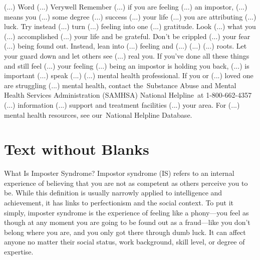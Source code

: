 \documentclass[14pt,a4paper]{extarticle}
\begin{document}
\newline\newline  (...) Word (...) Verywell \newline\newline 
Remember (...) if you are feeling (...) an impostor, (...) means you (...) some degree (...) success (...) your life (...) you are attributing (...) luck. Try instead (...) turn (...) feeling into one (...) gratitude. Look (...) what you (...) accomplished (...) your life and be grateful.
\newline\newline 
Don't be crippled (...) your fear (...) being found out. Instead, lean into (...) feeling and (...) (...) (...) roots. Let your guard down and let others see (...) real you. If you've done all these things and still feel (...) your feeling (...) being an impostor is holding you back, (...) is important (...) speak (...) (...) mental health professional.
\newline\newline 
If you or (...) loved one are struggling (...) mental health, contact the Substance Abuse and Mental Health Services Administration (SAMHSA) National Helpline at 1-800-662-4357 (...) information (...) support and treatment facilities (...) your area.
For (...) mental health resources, see our National Helpline Database.\newline\newline \newline\newline \section{Text without Blanks} What Is Imposter Syndrome? \newline\newline 
Impostor syndrome (IS) refers to an internal experience of believing that you are not as competent as others perceive you to be. While this definition is usually narrowly applied to intelligence and achievement, it has links to perfectionism and the social context.
\newline\newline 
To put it simply, imposter syndrome is the experience of feeling like a phony—you feel as though at any moment you are going to be found out as a fraud—like you don't belong where you are, and you only got there through dumb luck. It can affect anyone no matter their social status, work background, skill level, or degree of expertise.
\newline\newline 
\end{document}
